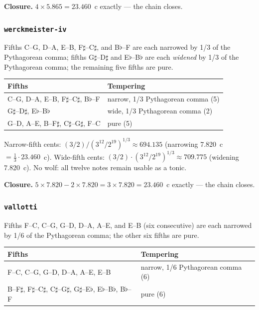 \documentclass[11pt,letterpaper]{report}
\begin{document}
\textbf{Closure.} $4 \times 5.865 = 23.460$~c exactly --- the chain
closes.

\subsubsection{\texttt{werckmeister-iv}}

Fifths C--G, D--A, E--B, F$\sharp$--C$\sharp$, and B$\flat$--F are each
narrowed by 1/3 of the Pythagorean comma; fifths G$\sharp$--D$\sharp$
and E$\flat$--B$\flat$ are each \emph{widened} by 1/3 of the Pythagorean
comma; the remaining five fifths are pure.

\begin{longtable}{p{9.5cm} p{2.5cm}}
  \toprule
  \textbf{Fifths} & \textbf{Tempering} \\
  \midrule
  \endhead
  C--G, D--A, E--B, F$\sharp$--C$\sharp$, B$\flat$--F &
    narrow, 1/3 Pythagorean comma (5) \\
  G$\sharp$--D$\sharp$, E$\flat$--B$\flat$ &
    wide, 1/3 Pythagorean comma (2) \\
  G--D, A--E, B--F$\sharp$, C$\sharp$--G$\sharp$, F--C & pure (5) \\
  \bottomrule
\end{longtable}

Narrow-fifth cents: $(3/2)/(3^{12}/2^{19})^{1/3} \approx 694.135$
(narrowing 7.820~c $= \tfrac{1}{3} \cdot 23.460$~c). Wide-fifth cents:
$(3/2) \cdot (3^{12}/2^{19})^{1/3} \approx 709.775$ (widening 7.820~c).
No wolf: all twelve notes remain usable as a tonic.

\textbf{Closure.} $5 \times 7.820 - 2 \times 7.820 = 3 \times 7.820 =
23.460$~c exactly --- the chain closes.

\subsubsection{\texttt{vallotti}}

Fifths F--C, C--G, G--D, D--A, A--E, and E--B (six consecutive) are each
narrowed by 1/6 of the Pythagorean comma; the other six fifths are pure.

\begin{longtable}{p{9.5cm} p{2.5cm}}
  \toprule
  \textbf{Fifths} & \textbf{Tempering} \\
  \midrule
  \endhead
  F--C, C--G, G--D, D--A, A--E, E--B & narrow, 1/6 Pythagorean comma (6) \\
  B--F$\sharp$, F$\sharp$--C$\sharp$, C$\sharp$--G$\sharp$,
    G$\sharp$--E$\flat$, E$\flat$--B$\flat$, B$\flat$--F & pure (6) \\
  \bottomrule
\end{longtable}
\end{document}
